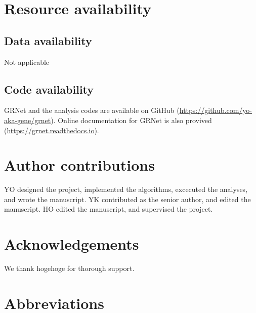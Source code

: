 \documentclass{article}
\begin{document}
\section*{Resource availability}
\subsection*{Data availability}
Not applicable
\subsection*{Code availability}
GRNet and the analysis codes are available on GitHub (\url{https://github.com/yo-aka-gene/grnet}).
Online documentation for GRNet is also provived (\url{https://grnet.readthedocs.io}).


\section*{Author contributions}
YO designed the project, implemented the algorithms, excecuted the analyses, and wrote the manuscript. YK 
contributed as the senior author, and edited the manuscript. HO edited the manuscript, and supervised the project.

\section*{Acknowledgements}
We thank hogehoge for thorough support.


\section*{Abbreviations}
\printacronyms[heading=Abbreviations]



\end{document}
